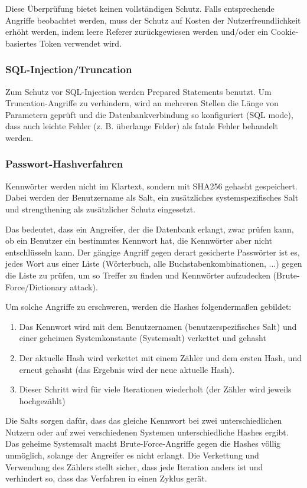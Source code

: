 \documentclass[parskip=half]{scrartcl}
\begin{document}
Diese Überprüfung bietet keinen vollständigen Schutz.
Falls entsprechende Angriffe beobachtet werden, muss der Schutz auf Kosten der Nutzerfreundlichkeit erhöht werden,
indem leere Referer zurückgewiesen werden und/oder ein Cookie-basiertes Token verwendet wird.

\subsubsection{SQL-Injection/Truncation}
Zum Schutz vor SQL-Injection werden Prepared Statements benutzt.
Um Truncation-Angriffe zu verhindern, wird an mehreren Stellen die Länge von Parametern geprüft
und die Datenbankverbindung so konfiguriert (SQL mode), dass auch leichte Fehler (z. B. überlange Felder) als fatale Fehler behandelt werden.

\subsubsection{Passwort-Hashverfahren}
\label{sec:pwhash}
Kennwörter werden nicht im Klartext, sondern mit SHA256 gehasht gespeichert.
Dabei werden der Benutzername als Salt, ein zusätzliches systemspezifisches Salt und strengthening als zusätzlicher Schutz eingesetzt.

Das bedeutet, dass ein Angreifer, der die Datenbank erlangt, zwar prüfen kann, ob ein Benutzer ein bestimmtes Kennwort hat,
die Kennwörter aber nicht entschlüsseln kann.
Der gängige Angriff gegen derart gesicherte Passwörter ist es, jedes Wort aus einer Liste (Wörterbuch, alle Buchstabenkombinationen, ...)
gegen die Liste zu prüfen, um so Treffer zu finden und Kennwörter aufzudecken (Brute-Force/Dictionary attack).

Um solche Angriffe zu erschweren, werden die Hashes folgendermaßen gebildet:
\begin{enumerate}
	\item Das Kennwort wird mit dem Benutzernamen (benutzerspezifisches Salt) und einer geheimen Systemkonstante (Systemsalt) verkettet und gehasht
	\item Der aktuelle Hash wird verkettet mit einem Zähler und dem ersten Hash, und erneut gehasht (das Ergebnis wird der neue aktuelle Hash).
	\item Dieser Schritt wird für viele Iterationen wiederholt (der Zähler wird jeweils hochgezählt)
\end{enumerate}

Die Salts sorgen dafür, dass das gleiche Kennwort bei zwei unterschiedlichen Nutzern oder auf zwei verschiedenen Systemen unterschiedliche Hashes ergibt.
Das geheime Systemsalt macht Brute-Force-Angriffe gegen die Hashes völlig unmöglich, solange der Angreifer es nicht erlangt.
Die Verkettung und Verwendung des Zählers stellt sicher, dass jede Iteration anders ist und verhindert so, dass das Verfahren in einen Zyklus gerät.
\end{document}
